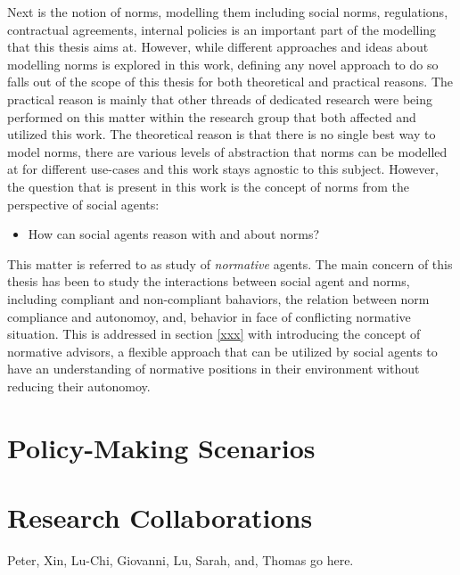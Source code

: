 Next is the notion of norms, modelling them including social norms, regulations, contractual agreements, internal policies is an important part of the modelling that this thesis aims at. However, while different approaches and ideas about modelling norms is explored in this work, defining any novel approach to do so falls out of the scope of this thesis for both theoretical and practical reasons. The practical reason is mainly that other threads of dedicated research were being performed on this matter within the research group that both affected and utilized this work. The theoretical reason is that there is no single best way to model norms, there are various levels of abstraction that norms can be modelled at for different use-cases and this work stays agnostic to this subject. However, the question that is present in this work is the concept of norms from the perspective of social agents:

\begin{itemize}
    \item How can social agents reason with and about norms?
\end{itemize}

This matter is referred to as study of \textit{normative} agents. The main concern of this thesis has been to study the interactions between social agent and norms, including compliant and non-compliant bahaviors, the relation between norm compliance and autonomoy, and, behavior in face of conflicting normative situation. This is addressed in section \ref{xxx} with introducing the concept of normative advisors, a flexible approach that can be utilized by social agents to have an understanding of normative positions in their environment without reducing their autonomoy.




\section{Policy-Making Scenarios}


\section{Research Collaborations}
Peter, Xin, Lu-Chi, Giovanni, Lu, Sarah, and, Thomas go here.
